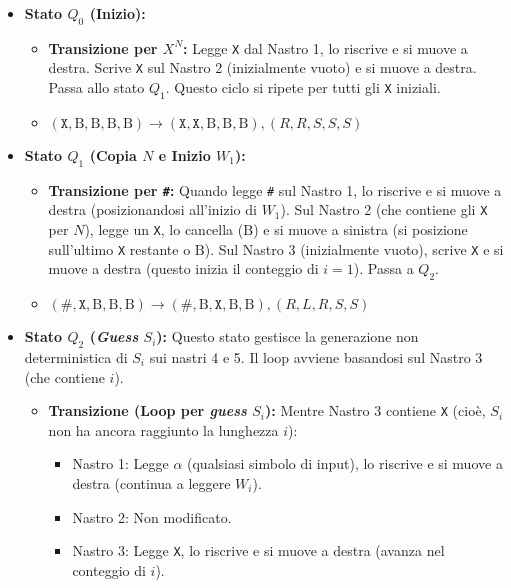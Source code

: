 \documentclass[a4paper]{article}
\newcommand{\B}{\text{B}} %
\begin{document}
\begin{itemize}
    \item \textbf{Stato $Q_0$ (Inizio):}
        \begin{itemize}
            \item \textbf{Transizione per $X^N$:} Legge \texttt{X} dal Nastro 1, lo riscrive e si muove a destra. Scrive \texttt{X} sul Nastro 2 (inizialmente vuoto) e si muove a destra. Passa allo stato $Q_1$. Questo ciclo si ripete per tutti gli \texttt{X} iniziali.
            \item $(\texttt{X}, \B, \B, \B, \B) \to (\texttt{X}, \texttt{X}, \B, \B, \B), (R,R,S,S,S)$
        \end{itemize}
    \item \textbf{Stato $Q_1$ (Copia $N$ e Inizio $W_1$):}
        \begin{itemize}
            \item \textbf{Transizione per \texttt{\#}:} Quando legge \texttt{\#} sul Nastro 1, lo riscrive e si muove a destra (posizionandosi all'inizio di $W_1$). Sul Nastro 2 (che contiene gli \texttt{X} per $N$), legge un \texttt{X}, lo cancella ($\B$) e si muove a sinistra (si posizione sull'ultimo \texttt{X} restante o $\B$). Sul Nastro 3 (inizialmente vuoto), scrive \texttt{X} e si muove a destra (questo inizia il conteggio di $i=1$). Passa a $Q_2$.
            \item $(\texttt{\#}, \texttt{X}, \B, \B, \B) \to (\texttt{\#}, \B, \texttt{X}, \B, \B), (R,L,R,S,S)$
        \end{itemize}
    \item \textbf{Stato $Q_2$ (\textit{Guess} $S_i$):}
        Questo stato gestisce la generazione non deterministica di $S_i$ sui nastri 4 e 5. Il loop avviene basandosi sul Nastro 3 (che contiene $i$).
        \begin{itemize}
            \item \textbf{Transizione (Loop per \textit{guess} $S_i$):}
                Mentre Nastro 3 contiene \texttt{X} (cioè, $S_i$ non ha ancora raggiunto la lunghezza $i$):
                \begin{itemize}
                    \item Nastro 1: Legge $\alpha$ (qualsiasi simbolo di input), lo riscrive e si muove a destra (continua a leggere $W_i$).
                    \item Nastro 2: Non modificato.
                    \item Nastro 3: Legge \texttt{X}, lo riscrive e si muove a destra (avanza nel conteggio di $i$).

\end{itemize}
\end{itemize}
\end{itemize}
\end{document}
